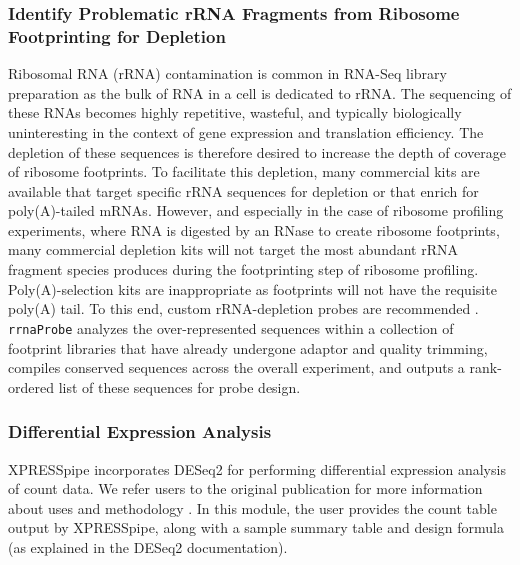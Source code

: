 \documentclass[10pt, oneside]{article}
\begin{document}
\subsubsection{Identify Problematic rRNA Fragments from Ribosome Footprinting for Depletion}
Ribosomal RNA (rRNA) contamination is common in RNA-Seq library preparation as the bulk of RNA in a cell is dedicated to rRNA. The sequencing of these RNAs becomes highly repetitive, wasteful, and typically biologically uninteresting in the context of gene expression and translation efficiency. The depletion of these sequences is therefore desired to increase the depth of coverage of ribosome footprints. To facilitate this depletion, many commercial kits are available that target specific rRNA sequences for depletion or that enrich for poly(A)-tailed mRNAs. However, and especially in the case of ribosome profiling experiments, where RNA is digested by an RNase to create ribosome footprints, many commercial depletion kits will not target the most abundant rRNA fragment species produces during the footprinting step of ribosome profiling. Poly(A)-selection kits are inappropriate as footprints will not have the requisite poly(A) tail. To this end, custom rRNA-depletion probes are recommended \cite{ingolia_meth, ingolia_science}. \texttt{rrnaProbe} analyzes the over-represented sequences within a collection of footprint libraries that have already undergone adaptor and quality trimming, compiles conserved sequences across the overall experiment, and outputs a rank-ordered list of these sequences for probe design.

\subsubsection{Differential Expression Analysis}
XPRESSpipe incorporates DESeq2 for performing differential expression analysis of count data. We refer users to the original publication for more information about uses and methodology \cite{deseq2}. In this module, the user provides the count table output by XPRESSpipe, along with a sample summary table and design formula (as explained in the DESeq2 documentation).
\end{document}
